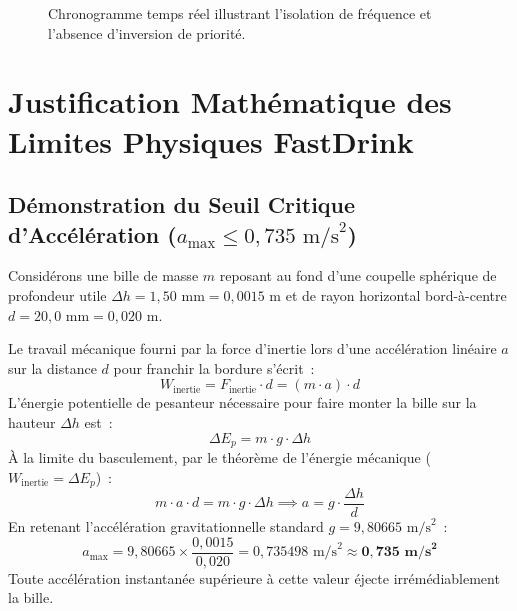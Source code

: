 \begin{figure}[htbp]
\caption{Chronogramme temps réel illustrant l'isolation de fréquence et l'absence d'inversion de priorité.}
\label{fig:timing_diagram}
\end{figure}

\section{Justification Mathématique des Limites Physiques FastDrink}

\subsection{\texorpdfstring{Démonstration du Seuil Critique d'Accélération ($a_{\max} \le 0{,}735\text{ m/s}^2$)}{Démonstration du Seuil Critique d'Accélération (a <= 0.735 m/s2)}}
Considérons une bille de masse $m$ reposant au fond d'une coupelle sphérique de profondeur utile $\Delta h = 1{,}50\text{ mm} = 0{,}0015\text{ m}$ et de rayon horizontal bord-à-centre $d = 20{,}0\text{ mm} = 0{,}020\text{ m}$.

Le travail mécanique fourni par la force d'inertie lors d'une accélération linéaire $a$ sur la distance $d$ pour franchir la bordure s'écrit~:
\begin{equation}
    W_{\text{inertie}} = F_{\text{inertie}} \cdot d = (m \cdot a) \cdot d
\end{equation}
L'énergie potentielle de pesanteur nécessaire pour faire monter la bille sur la hauteur $\Delta h$ est~:
\begin{equation}
    \Delta E_p = m \cdot g \cdot \Delta h
\end{equation}
À la limite du basculement, par le théorème de l'énergie mécanique ($W_{\text{inertie}} = \Delta E_p$)~:
\begin{equation}
    m \cdot a \cdot d = m \cdot g \cdot \Delta h \implies a = g \cdot \frac{\Delta h}{d}
\end{equation}
En retenant l'accélération gravitationnelle standard $g = 9{,}80665\text{ m/s}^2$~:
\begin{equation}
    a_{\max} = 9{,}80665 \times \frac{0{,}0015}{0{,}020} = 0{,}735498\text{ m/s}^2 \approx \mathbf{0{,}735\text{ m/s}^2}
\end{equation}
Toute accélération instantanée supérieure à cette valeur éjecte irrémédiablement la bille.

